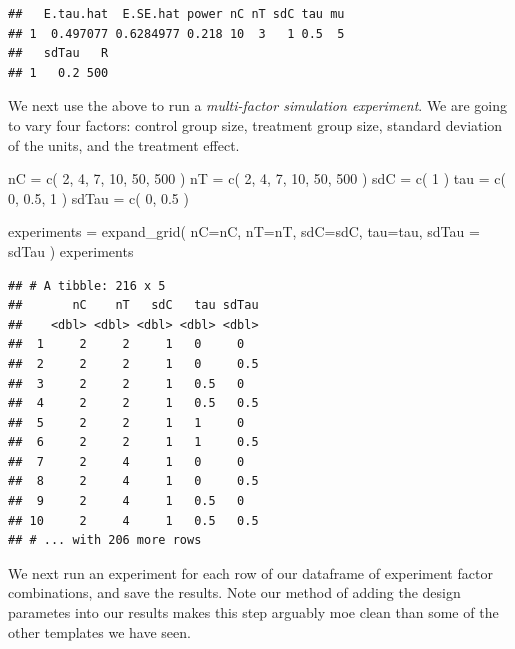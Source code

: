 \documentclass[
]{book}
\newenvironment{Shaded}{\begin{snugshade}}{\end{snugshade}}
\newcommand{\AttributeTok}[1]{\textcolor[rgb]{0.77,0.63,0.00}{#1}}
\newcommand{\DecValTok}[1]{\textcolor[rgb]{0.00,0.00,0.81}{#1}}
\newcommand{\FloatTok}[1]{\textcolor[rgb]{0.00,0.00,0.81}{#1}}
\newcommand{\FunctionTok}[1]{\textcolor[rgb]{0.00,0.00,0.00}{#1}}
\newcommand{\NormalTok}[1]{#1}
\newcommand{\OtherTok}[1]{\textcolor[rgb]{0.56,0.35,0.01}{#1}}
\begin{document}
\begin{verbatim}
##   E.tau.hat  E.SE.hat power nC nT sdC tau mu
## 1  0.497077 0.6284977 0.218 10  3   1 0.5  5
##   sdTau   R
## 1   0.2 500
\end{verbatim}

We next use the above to run a \emph{multi-factor simulation experiment}. We are
going to vary four factors: control group size, treatment group size,
standard deviation of the units, and the treatment effect.

\begin{Shaded}
\begin{Highlighting}[]
\NormalTok{nC }\OtherTok{=} \FunctionTok{c}\NormalTok{( }\DecValTok{2}\NormalTok{, }\DecValTok{4}\NormalTok{, }\DecValTok{7}\NormalTok{, }\DecValTok{10}\NormalTok{, }\DecValTok{50}\NormalTok{, }\DecValTok{500}\NormalTok{ )}
\NormalTok{nT }\OtherTok{=} \FunctionTok{c}\NormalTok{( }\DecValTok{2}\NormalTok{, }\DecValTok{4}\NormalTok{, }\DecValTok{7}\NormalTok{, }\DecValTok{10}\NormalTok{, }\DecValTok{50}\NormalTok{, }\DecValTok{500}\NormalTok{ )}
\NormalTok{sdC }\OtherTok{=} \FunctionTok{c}\NormalTok{( }\DecValTok{1}\NormalTok{ )}
\NormalTok{tau }\OtherTok{=} \FunctionTok{c}\NormalTok{( }\DecValTok{0}\NormalTok{, }\FloatTok{0.5}\NormalTok{, }\DecValTok{1}\NormalTok{ )}
\NormalTok{sdTau }\OtherTok{=} \FunctionTok{c}\NormalTok{( }\DecValTok{0}\NormalTok{, }\FloatTok{0.5}\NormalTok{ )}

\NormalTok{experiments }\OtherTok{=} \FunctionTok{expand\_grid}\NormalTok{( }\AttributeTok{nC=}\NormalTok{nC, }\AttributeTok{nT=}\NormalTok{nT, }\AttributeTok{sdC=}\NormalTok{sdC, }\AttributeTok{tau=}\NormalTok{tau, }\AttributeTok{sdTau =}\NormalTok{ sdTau )}
\NormalTok{experiments}
\end{Highlighting}
\end{Shaded}

\begin{verbatim}
## # A tibble: 216 x 5
##       nC    nT   sdC   tau sdTau
##    <dbl> <dbl> <dbl> <dbl> <dbl>
##  1     2     2     1   0     0  
##  2     2     2     1   0     0.5
##  3     2     2     1   0.5   0  
##  4     2     2     1   0.5   0.5
##  5     2     2     1   1     0  
##  6     2     2     1   1     0.5
##  7     2     4     1   0     0  
##  8     2     4     1   0     0.5
##  9     2     4     1   0.5   0  
## 10     2     4     1   0.5   0.5
## # ... with 206 more rows
\end{verbatim}

We next run an experiment for each row of our dataframe of experiment factor
combinations, and save the results.
Note our method of adding the design parametes into our results makes this step arguably moe clean than some of the other templates we have seen.
\end{document}
